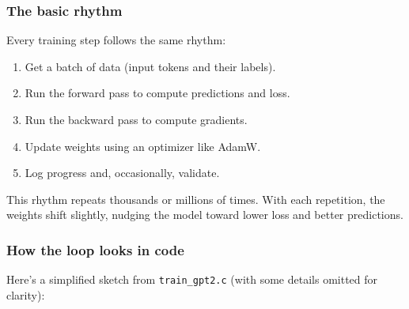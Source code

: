 \documentclass[
  letterpaper,
  DIV=11,
  numbers=noendperiod]{scrreprt}
\providecommand{\tightlist}{%
  \setlength{\itemsep}{0pt}\setlength{\parskip}{0pt}}
\begin{document}
\subsubsection{The basic rhythm}\label{the-basic-rhythm}

Every training step follows the same rhythm:

\begin{enumerate}
\def\labelenumi{\arabic{enumi}.}
\tightlist
\item
  Get a batch of data (input tokens and their labels).
\item
  Run the forward pass to compute predictions and loss.
\item
  Run the backward pass to compute gradients.
\item
  Update weights using an optimizer like AdamW.
\item
  Log progress and, occasionally, validate.
\end{enumerate}

This rhythm repeats thousands or millions of times. With each
repetition, the weights shift slightly, nudging the model toward lower
loss and better predictions.

\subsubsection{How the loop looks in
code}\label{how-the-loop-looks-in-code}

Here's a simplified sketch from \texttt{train\_gpt2.c} (with some
details omitted for clarity):
\end{document}
